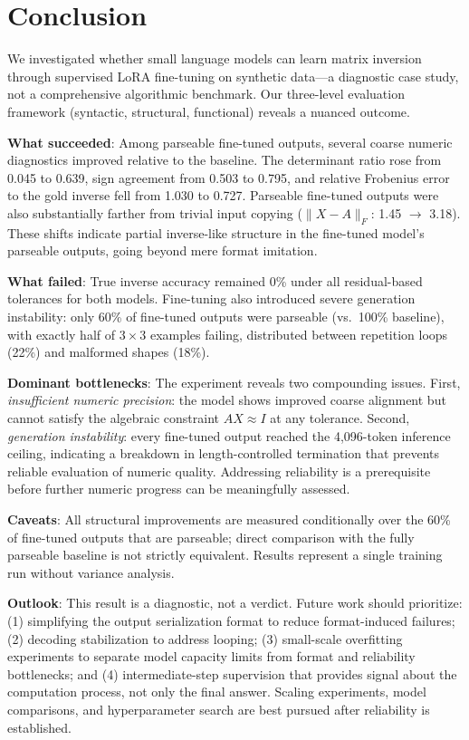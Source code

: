 \section{Conclusion}

We investigated whether small language models can learn matrix inversion through supervised LoRA fine-tuning on synthetic data---a diagnostic case study, not a comprehensive algorithmic benchmark. Our three-level evaluation framework (syntactic, structural, functional) reveals a nuanced outcome.

\textbf{What succeeded}: Among parseable fine-tuned outputs, several coarse numeric diagnostics improved relative to the baseline. The determinant ratio rose from 0.045 to 0.639, sign agreement from 0.503 to 0.795, and relative Frobenius error to the gold inverse fell from 1.030 to 0.727. Parseable fine-tuned outputs were also substantially farther from trivial input copying ($\|X - A\|_F$: 1.45 $\to$ 3.18). These shifts indicate partial inverse-like structure in the fine-tuned model's parseable outputs, going beyond mere format imitation.

\textbf{What failed}: True inverse accuracy remained 0\% under all residual-based tolerances for both models. Fine-tuning also introduced severe generation instability: only 60\% of fine-tuned outputs were parseable (vs.\ 100\% baseline), with exactly half of $3 \times 3$ examples failing, distributed between repetition loops (22\%) and malformed shapes (18\%).

\textbf{Dominant bottlenecks}: The experiment reveals two compounding issues. First, \emph{insufficient numeric precision}: the model shows improved coarse alignment but cannot satisfy the algebraic constraint $AX \approx I$ at any tolerance. Second, \emph{generation instability}: every fine-tuned output reached the 4{,}096-token inference ceiling, indicating a breakdown in length-controlled termination that prevents reliable evaluation of numeric quality. Addressing reliability is a prerequisite before further numeric progress can be meaningfully assessed.

\textbf{Caveats}: All structural improvements are measured conditionally over the 60\% of fine-tuned outputs that are parseable; direct comparison with the fully parseable baseline is not strictly equivalent. Results represent a single training run without variance analysis.

\textbf{Outlook}: This result is a diagnostic, not a verdict. Future work should prioritize: (1) simplifying the output serialization format to reduce format-induced failures; (2) decoding stabilization to address looping; (3) small-scale overfitting experiments to separate model capacity limits from format and reliability bottlenecks; and (4) intermediate-step supervision that provides signal about the computation process, not only the final answer. Scaling experiments, model comparisons, and hyperparameter search are best pursued after reliability is established.
